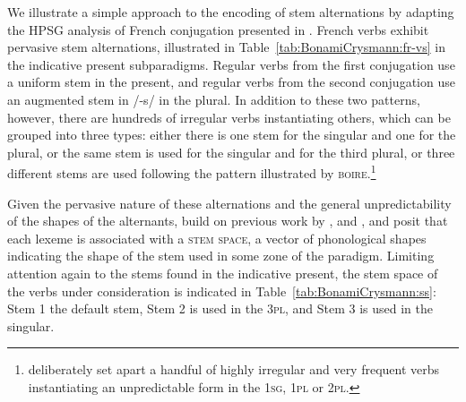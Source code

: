 \documentclass[output=paper]{langsci/langscibook}
\begin{document}
We illustrate a simple approach to the encoding of stem alternations
by adapting the HPSG analysis of French conjugation presented in
\citet{Bonami06}. French verbs exhibit pervasive stem alternations,
illustrated in Table~\ref{tab:BonamiCrysmann:fr-vs} in the indicative present
subparadigms. Regular verbs from the first conjugation use a uniform
stem in the present, and regular verbs from the second conjugation use
an augmented stem in /-s/ in the plural. In addition to these two
patterns, however, there are hundreds of irregular verbs instantiating
others, which can be grouped into three types: either there is one stem
for the singular and one for the plural, or the same stem is used for
the singular and for the third plural, or three different stems are
used following the pattern illustrated by
\textsc{boire}.\footnote{\citet{Bonami06} deliberately set apart a
  handful of highly irregular and very frequent verbs instantiating an
  unpredictable form in the \textsc{1sg}, \textsc{1pl} or
  \textsc{2pl}.}


\begin{table}[htb]
\caption{Sample French present indicative paradigms illustrating recurrent stem alternation patterns\label{tab:BonamiCrysmann:fr-vs}}
\end{table}

Given the pervasive nature of these alternations and the general
unpredictability of the shapes of the alternants, \citet{Bonami03a}
build on previous work by
\citet{Aronoff94,Brown98,Hippisley98}, and \citet{Stump01}, and posit that each lexeme
is associated with a \textsc{stem space}, a vector of phonological
shapes indicating the shape of the stem used in some zone of the
paradigm. Limiting attention again to the stems found in the indicative
present, the stem space of the verbs under consideration is indicated
in Table~\ref{tab:BonamiCrysmann:ss}: Stem 1 the default stem, Stem 2 is used in the
\textsc{3pl}, and Stem 3 is used in the singular.
\end{document}
